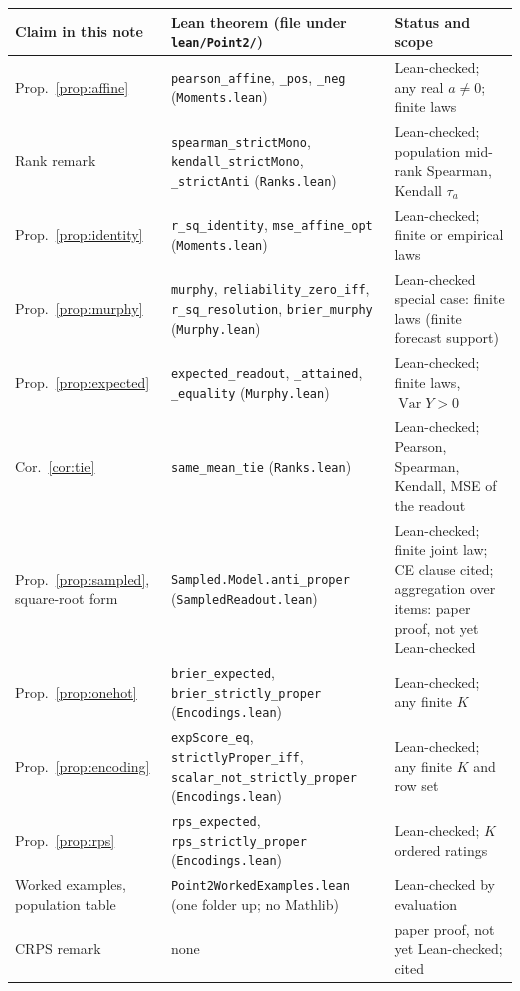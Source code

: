 \documentclass[11pt]{article}
\theoremstyle{remark}
\theoremstyle{definition}
\newcommand{\Var}{\operatorname{Var}}
\newcommand{\1}{\mathbf{1}}
\newcommand{\file}[1]{\nolinkurl{#1}}
\begin{document}
\begin{center}
\small
\begin{tabular}{P{3.6cm}P{6.0cm}P{4.8cm}}
\toprule
Claim in this note & Lean theorem (file under \file{lean/Point2/}) & Status and scope \\
\midrule
Prop.~\ref{prop:affine} & \texttt{pearson\_affine}, \texttt{\_pos}, \texttt{\_neg} (\file{Moments.lean}) & Lean-checked; any real $a\neq0$; finite laws \\
Rank remark & \texttt{spearman\_strictMono}, \texttt{kendall\_strictMono}, \texttt{\_strictAnti} (\file{Ranks.lean}) & Lean-checked; population mid-rank Spearman, Kendall $\tau_a$ \\
Prop.~\ref{prop:identity} & \texttt{r\_sq\_identity}, \texttt{mse\_affine\_opt} (\file{Moments.lean}) & Lean-checked; finite or empirical laws \\
Prop.~\ref{prop:murphy} & \texttt{murphy}, \texttt{reliability\_zero\_iff}, \texttt{r\_sq\_resolution}, \texttt{brier\_murphy} (\file{Murphy.lean}) & Lean-checked special case: finite laws (finite forecast support) \\
Prop.~\ref{prop:expected} & \texttt{expected\_readout}, \texttt{\_attained}, \texttt{\_equality} (\file{Murphy.lean}) & Lean-checked; finite laws, $\Var Y>0$ \\
Cor.~\ref{cor:tie} & \texttt{same\_mean\_tie} (\file{Ranks.lean}) & Lean-checked; Pearson, Spearman, Kendall, MSE of the readout \\
Prop.~\ref{prop:sampled}, square-root form & \texttt{Sampled.Model.anti\_proper} (\file{SampledReadout.lean}) & Lean-checked; finite joint law; CE clause cited; aggregation over items: paper proof, not yet Lean-checked \\
Prop.~\ref{prop:onehot} & \texttt{brier\_expected}, \texttt{brier\_strictly\_proper} (\file{Encodings.lean}) & Lean-checked; any finite $K$ \\
Prop.~\ref{prop:encoding} & \texttt{expScore\_eq}, \texttt{strictlyProper\_iff}, \texttt{scalar\_not\_strictly\_proper} (\file{Encodings.lean}) & Lean-checked; any finite $K$ and row set \\
Prop.~\ref{prop:rps} & \texttt{rps\_expected}, \texttt{rps\_strictly\_proper} (\file{Encodings.lean}) & Lean-checked; $K$ ordered ratings \\
Worked examples, population table & \file{Point2WorkedExamples.lean} (one folder up; no Mathlib) & Lean-checked by evaluation \\
CRPS remark & none & paper proof, not yet Lean-checked; cited \\
\bottomrule
\end{tabular}
\end{center}
\end{document}
